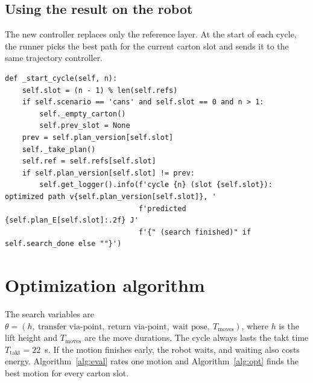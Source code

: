 \documentclass[12pt,a4paper]{article}
\begin{document}
\subsection{Using the result on the robot}

The new controller replaces only the reference layer. At the start of each cycle, the runner picks the best path for the current carton slot and sends it to the same trajectory controller.

\begin{lstlisting}[caption={Choosing the path for the next can (\texttt{runner\_node.py})}]
def _start_cycle(self, n):
    self.slot = (n - 1) % len(self.refs)
    if self.scenario == 'cans' and self.slot == 0 and n > 1:
        self._empty_carton()
        self.prev_slot = None
    prev = self.plan_version[self.slot]
    self._take_plan()
    self.ref = self.refs[self.slot]
    if self.plan_version[self.slot] != prev:
        self.get_logger().info(f'cycle {n} (slot {self.slot}): optimized path v{self.plan_version[self.slot]}, '
                               f'predicted {self.plan_E[self.slot]:.2f} J'
                               f'{" (search finished)" if self.search_done else ""}')
\end{lstlisting}

\section{Optimization algorithm}

The search variables are
$\theta = (h,\ \text{transfer via-point},\ \text{return via-point},\ \text{wait pose},\ T_{\text{moves}})$,
where $h$ is the lift height and $T_{\text{moves}}$ are the move durations. The cycle always lasts the takt time $T_{\text{takt}} = 22$~s. If the motion finishes early, the robot waits, and waiting also costs energy. Algorithm~\ref{alg:eval} rates one motion and Algorithm~\ref{alg:opt} finds the best motion for every carton slot.
\end{document}
